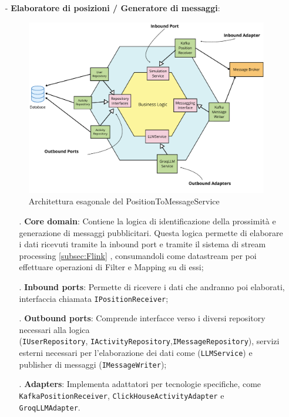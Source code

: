 \documentclass[10pt]{article}
\begin{document}
\begin{itemize}
        \item[-] \textbf{Elaboratore di posizioni / Generatore di messaggi}:
        \begin{figure}[H]
        \centering
        \includegraphics[width=\textwidth]{ProcessorService.pdf}
        \caption{Architettura esagonale del PositionToMessageService}
        \end{figure}
        \begin{itemize}
            \item[.] \textbf{Core domain}: Contiene la logica di identificazione della prossimità e generazione di messaggi pubblicitari. Questa logica permette di elaborare i dati ricevuti tramite la inbound port e tramite il sistema di stream processing \ref{subsec:Flink} , consumandoli come datastream per poi effettuare operazioni di Filter e Mapping su di essi;
            \item[.] \textbf{Inbound ports}: Permette di ricevere i dati che andranno poi elaborati, interfaccia chiamata \texttt{IPositionReceiver};
            \item[.] \textbf{Outbound ports}: Comprende interfacce verso i diversi repository necessari alla logica \\ (\texttt{IUserRepository}, \texttt{IActivityRepository},\texttt{IMessageRepository}), servizi esterni necessari per l'elaborazione dei dati come  (\texttt{LLMService}) e publisher di messaggi (\texttt{IMessageWriter});
            \item[.] \textbf{Adapters}: Implementa adattatori per tecnologie specifiche, come \texttt{KafkaPositionReceiver}, \texttt{ClickHouseActivityAdapter} e \texttt{GroqLLMAdapter}.
        \end{itemize}
    \end{itemize}
\end{document}
